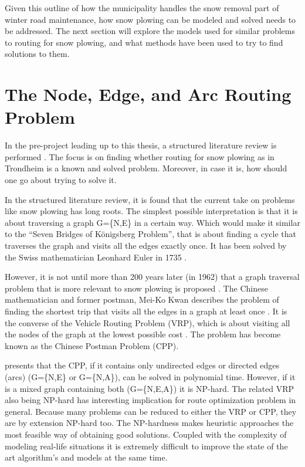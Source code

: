 
Given this outline of how the municipality handles the snow removal part of winter road maintenance, how snow plowing can be modeled and solved needs to be addressed. The next section will explore the models used for similar problems to routing for snow plowing, and what methods have been used to try to find solutions to them.


\section{The Node, Edge, and Arc Routing Problem}
\label{the_nearp}

In the pre-project leading up to this thesis, a structured literature review is performed \citep{forprosjektet}. The focus is on finding whether routing for snow plowing as in Trondheim is a known and solved problem. Moreover, in case it is, how should one go about trying to solve it.

In the structured literature review, it is found that the current take on problems like snow plowing has long roots. The simplest possible interpretation is that it is about traversing a graph G=\{N,E\} in a certain way. Which would make it similar to the “Seven Bridges of Königsberg Problem”, that is about finding a cycle that traverses the graph and visits all the edges exactly once. It has been solved by the Swiss mathematician Leonhard Euler in 1735 \citep{eulerBridges}.

However, it is not until more than 200 years later (in 1962) that a graph traversal problem that is more relevant to snow plowing is proposed \citep{wohlk2008decade}. The Chinese mathematician and former postman, Mei-Ko Kwan describes the problem of finding the shortest trip that visits all the edges in a graph at least once \citep{meiKoKwanCPP}. It is the converse of the Vehicle Routing Problem (VRP), which is about visiting all the nodes of the graph at the lowest possible cost \citep{laporte1992vehicle}. The problem has become known as the Chinese Postman Problem (CPP).

\citet{wohlk2008decade} presents that the CPP, if it contains only undirected edges or directed edges (arcs) (G=\{N,E\} or G=\{N,A\}), can be solved in polynomial time. However, if it is a mixed graph containing both (G=\{N,E,A\}) it is NP-hard. The related VRP also being NP-hard has interesting implication for route optimization problem in general. Because many problems can be reduced to either the VRP or CPP, they are by extension NP-hard too. The NP-hardness makes heuristic approaches the most feasible way of obtaining good solutions. Coupled with the complexity of modeling real-life situations it is extremely difficult to improve the state of the art algorithm's and models at the same time.

